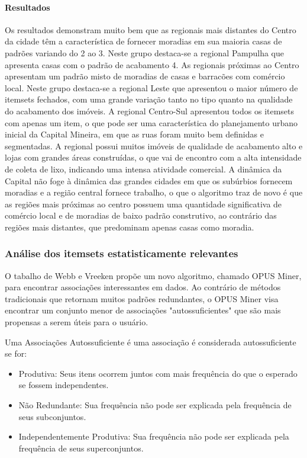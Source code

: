 \documentclass[12pt]{article}
\begin{document}
\paragraph{Resultados}
Os resultados demonstram muito bem que as regionais mais distantes do Centro da cidade têm a característica de fornecer moradias em sua maioria casas de padrões variando do 2 ao 3. Neste grupo destaca-se a regional Pampulha que apresenta casas com o padrão de acabamento 4. As regionais próximas ao Centro apresentam um padrão misto de moradias de casas e barracões com comércio local. Neste grupo destaca-se a regional Leste que apresentou o maior número de itemsets fechados, com uma grande variação tanto no tipo quanto na qualidade do acabamento dos imóveis. A regional Centro-Sul apresentou todos os itemsets com apenas um item, o que pode ser uma característica do planejamento urbano inicial da Capital Mineira, em que as ruas foram muito bem definidas e segmentadas. A regional possui muitos imóveis de qualidade de acabamento alto e lojas com grandes áreas construídas, o que vai de encontro com a alta intensidade de coleta de lixo, indicando uma intensa atividade comercial. A dinâmica da Capital não foge à dinâmica das grandes cidades em que os subúrbios fornecem moradias e a região central fornece trabalho, o que o algoritmo traz de novo é que as regiões mais próximas ao centro possuem uma quantidade significativa de comércio local e de moradias de baixo padrão construtivo, ao contrário das regiões mais distantes, que predominam apenas casas como moradia. 

\subsubsection{Análise dos itemsets estatisticamente relevantes}
O tabalho de Webb e Vreeken \cite{webb2013efficient} propõe um novo algoritmo, chamado OPUS Miner, para encontrar associações interessantes em dados. Ao contrário de métodos tradicionais que retornam muitos padrões redundantes, o OPUS Miner visa encontrar um conjunto menor de associações "autossuficientes" que são mais propensas a serem úteis para o usuário. 

 Uma Associações Autossuficiente é uma associação é considerada autossuficiente se for: 
\begin{itemize}
    \item Produtiva: Seus itens ocorrem juntos com mais frequência do que o esperado se fossem independentes.
    \item Não Redundante: Sua frequência não pode ser explicada pela frequência de seus subconjuntos. 
    \item Independentemente Produtiva: Sua frequência não pode ser explicada pela frequência de seus superconjuntos. 
\end{itemize}
\end{document}
